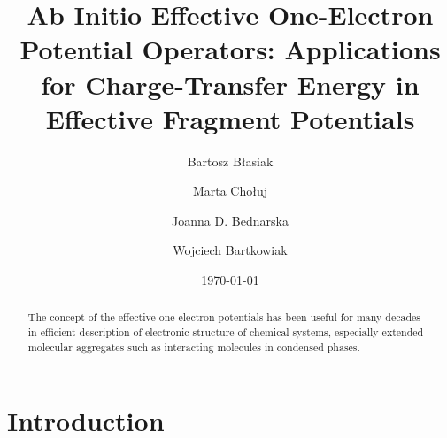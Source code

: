 


\title{Ab Initio Effective One-Electron Potential Operators:
Applications for Charge-Transfer Energy in Effective Fragment Potentials}

\author{Bartosz B{\l}asiak}

\author{Marta Cho{\l}uj} 
\author{Joanna D. Bednarska}
\author{Wojciech Bartkowiak}


\date{\today}

\begin{abstract}
The concept of the effective one-electron potentials has been useful for many decades
in efficient description of electronic structure of chemical systems, especially extended
molecular aggregates such as interacting molecules in condensed phases.
\end{abstract}

\pacs{}

\maketitle

\tableofcontents

\section{\label{s:1.introduction}Introduction}

